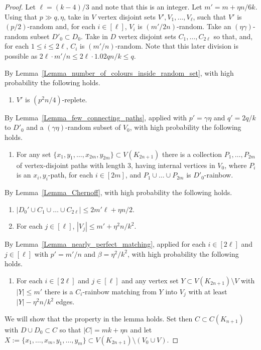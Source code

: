\begin{proof} Let $\ell=(k-4)/3$ and note that this is an integer. Let $m'=m+\eta n/6k$. Using that $p\gg q,\eta$, take in $V$ vertex disjoint sets $V',V_1,\ldots,V_{\ell}$, such that $V'$ is $(p/2)$-random and, for each $i\in [\ell]$, $V_i$ is $(m'/2n)$-random. Take an $(\eta\gamma)$-random subset $D'_0\subset D_0$. Take in $D$ vertex disjoint sets $C_1,\ldots,C_{2\ell}$ so that, and, for each $1\leq i\leq 2\ell$, $C_i$ is $(m'/n)$-random.
 Note that this later division is possible as $2\ell\cdot m'/n\leq 2\ell \cdot 1.02q n/k\leq q$.

By Lemma~\ref{Lemma_number_of_colours_inside_random_set}, with high probability the following holds.
\addtocounter{propcounter}{1}
\begin{enumerate}[label = {\bfseries \Alph{propcounter}\arabic{enumi}}]
\item $V'$ is $(p^2 n/4)$-replete.\label{mice1}
\end{enumerate}
By Lemma~\ref{Lemma_few_connecting_paths}, applied with $p'=\gamma\eta$ and $q'=2q/k$ to $D'_0$ and a $(\gamma\eta)$-random subset of $V_0$, with high probability the following holds.
\begin{enumerate}[label = {\bfseries \Alph{propcounter}\arabic{enumi}}]\addtocounter{enumi}{1}
\item For any set $\{x_1, y_1, \dots, x_{2m}, y_{2m}\}\subset V(K_{2n+1})$
 there is a collection $P_1, \dots, P_{2m}$ of vertex-disjoint paths with length $3$, having internal vertices in $V_0$, where $P_i$ is an $x_i,y_i$-path, for each $i\in [2m]$, and $P_1\cup \dots\cup P_{2m}$ is $D'_0$-rainbow.\label{mice1a}
\end{enumerate}
By Lemma~\ref{Lemma_Chernoff}, with high probability the following holds.
\begin{enumerate}[label = {\bfseries \Alph{propcounter}\arabic{enumi}}]\addtocounter{enumi}{3}
\item $|D_0'\cup C_1\cup \ldots\cup C_{2\ell}|\leq 2m'\ell +\eta n/2$. \label{mice1b}
\item For each $j\in [\ell]$, $|V_j|\leq m'+\eta^2 n/k^2$.\label{mice1bb}
\end{enumerate}
By Lemma~\ref{Lemma_nearly_perfect_matching}, applied for each $i\in [2\ell]$ and $j\in [\ell]$ with $p'=m'/n$ and $\beta=\eta^2/k^2$, with high probability the following holds.
\begin{enumerate}[label = {\bfseries \Alph{propcounter}\arabic{enumi}}]\addtocounter{enumi}{5}
\item For each $i\in [2\ell]$ and $j\in [\ell]$ and any vertex set $Y\subset V(K_{2n+1})\setminus V$ with $|Y|\leq m'$ there is a $C_i$-rainbow matching from $Y$ into $V_j$ with at least $|Y|-\eta^2 n/k^2$ edges.\label{mice2}
\end{enumerate}
We will show that the property in the lemma holds. Set then $C\subset C(K_{n+1})$ with $D\cup D_0\subset C$ so that $|C|=mk+\eta n$ and let $X:=\{x_1,\ldots,x_m,y_1,\ldots,y_m\}\subset V(K_{2n+1})\setminus (V_0\cup V)$.


\end{proof}
